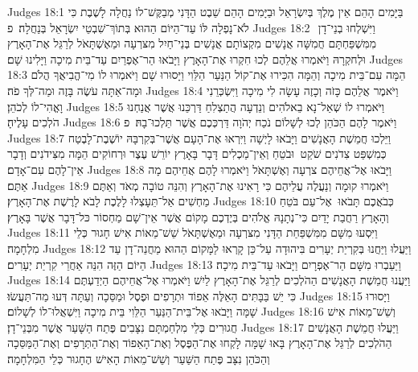 Judges 18:1	בַּיָּמִים הָהֵם אֵין מֶלֶךְ בְּיִשְׂרָאֵל וּבַיָּמִים הָהֵם שֵׁבֶט הַדָּנִי מְבַקֶּשׁ־לוֹ נַחֲלָה לָשֶׁבֶת כִּי לֹא־נָפְלָה לּוֹ עַד־הַיּוֹם הַהוּא בְּתוֹךְ־שִׁבְטֵי יִשְׂרָאֵל בְּנַחֲלָה׃ {פ}
Judges 18:2	וַיִּשְׁלְחוּ בְנֵי־דָן  מִמִּשְׁפַּחְתָּם חֲמִשָּׁה אֲנָשִׁים מִקְצוֹתָם אֲנָשִׁים בְּנֵי־חַיִל מִצּרְעָה וּמֵאֶשְׁתָּאֹל לְרַגֵּל אֶת־הָאָרֶץ וּלְחקְרָהּ וַיֹּאמְרוּ אֲלֵהֶם לְכוּ חִקְרוּ אֶת־הָאָרֶץ וַיָּבֹאוּ הַר־אֶפְרַיִם עַד־בֵּית מִיכָה וַיָּלִינוּ שָׁם׃
Judges 18:3	הֵמָּה עִם־בֵּית מִיכָה וְהֵמָּה הִכִּירוּ אֶת־קוֹל הַנַּעַר הַלֵּוִי וַיָּסוּרוּ שָׁם וַיֹּאמְרוּ לוֹ מִי־הֱבִיאֲךָ הֲלֹם וּמָה־אַתָּה עֹשֶׂה בָּזֶה וּמַה־לְּךָ פֹה׃
Judges 18:4	וַיֹּאמֶר אֲלֵהֶם כָּזֹה וְכָזֶה עָשָׂה לִי מִיכָה וַיִּשְׂכְּרֵנִי וָאֱהִי־לוֹ לְכֹהֵן׃
Judges 18:5	וַיֹּאמְרוּ לוֹ שְׁאַל־נָא בֵאלֹהִים וְנֵדְעָה הֲתַצְלִחַ דַּרְכֵּנוּ אֲשֶׁר אֲנַחְנוּ הֹלְכִים עָלֶיהָ׃
Judges 18:6	וַיֹּאמֶר לָהֶם הַכֹּהֵן לְכוּ לְשָׁלוֹם נֹכַח יְהֹוָה דַּרְכְּכֶם אֲשֶׁר תֵּלְכוּ־בָהּ׃ {פ}
Judges 18:7	וַיֵּלְכוּ חֲמֵשֶׁת הָאֲנָשִׁים וַיָּבֹאוּ לָיְשָׁה וַיִּרְאוּ אֶת־הָעָם אֲשֶׁר־בְּקִרְבָּהּ יוֹשֶׁבֶת־לָבֶטַח כְּמִשְׁפַּט צִדֹנִים שֹׁקֵט  וּבֹטֵחַ וְאֵין־מַכְלִים דָּבָר בָּאָרֶץ יוֹרֵשׁ עֶצֶר וּרְחוֹקִים הֵמָּה מִצִּידֹנִים וְדָבָר אֵין־לָהֶם עִם־אָדָם׃
Judges 18:8	וַיָּבֹאוּ אֶל־אֲחֵיהֶם צרְעָה וְאֶשְׁתָּאֹל וַיֹּאמְרוּ לָהֶם אֲחֵיהֶם מָה אַתֶּם׃
Judges 18:9	וַיֹּאמְרוּ קוּמָה וְנַעֲלֶה עֲלֵיהֶם כִּי רָאִינוּ אֶת־הָאָרֶץ וְהִנֵּה טוֹבָה מְאֹד וְאַתֶּם מַחְשִׁים אַל־תֵּעָצְלוּ לָלֶכֶת לָבֹא לָרֶשֶׁת אֶת־הָאָרֶץ׃
Judges 18:10	כְּבֹאֲכֶם תָּבֹאוּ  אֶל־עַם בֹּטֵחַ וְהָאָרֶץ רַחֲבַת יָדַיִם כִּי־נְתָנָהּ אֱלֹהִים בְּיֶדְכֶם מָקוֹם אֲשֶׁר אֵין־שָׁם מַחְסוֹר כּל־דָּבָר אֲשֶׁר בָּאָרֶץ׃
Judges 18:11	וַיִּסְעוּ מִשָּׁם מִמִּשְׁפַּחַת הַדָּנִי מִצּרְעָה וּמֵאֶשְׁתָּאֹל שֵׁשׁ־מֵאוֹת אִישׁ חָגוּר כְּלֵי מִלְחָמָה׃
Judges 18:12	וַיַּעֲלוּ וַיַּחֲנוּ בְּקִרְיַת יְעָרִים בִּיהוּדָה עַל־כֵּן קָרְאוּ לַמָּקוֹם הַהוּא מַחֲנֵה־דָן עַד הַיּוֹם הַזֶּה הִנֵּה אַחֲרֵי קִרְיַת יְעָרִים׃
Judges 18:13	וַיַּעַבְרוּ מִשָּׁם הַר־אֶפְרָיִם וַיָּבֹאוּ עַד־בֵּית מִיכָה׃
Judges 18:14	וַיַּעֲנוּ חֲמֵשֶׁת הָאֲנָשִׁים הַהֹלְכִים לְרַגֵּל אֶת־הָאָרֶץ לַיִשׁ וַיֹּאמְרוּ אֶל־אֲחֵיהֶם הַיְדַעְתֶּם כִּי יֵשׁ בַּבָּתִּים הָאֵלֶּה אֵפוֹד וּתְרָפִים וּפֶסֶל וּמַסֵּכָה וְעַתָּה דְּעוּ מַה־תַּעֲשׂוּ׃
Judges 18:15	וַיָּסוּרוּ שָׁמָּה וַיָּבֹאוּ אֶל־בֵּית־הַנַּעַר הַלֵּוִי בֵּית מִיכָה וַיִּשְׁאֲלוּ־לוֹ לְשָׁלוֹם׃
Judges 18:16	וְשֵׁשׁ־מֵאוֹת אִישׁ חֲגוּרִים כְּלֵי מִלְחַמְתָּם נִצָּבִים פֶּתַח הַשָּׁעַר אֲשֶׁר מִבְּנֵי־דָן׃
Judges 18:17	וַיַּעֲלוּ חֲמֵשֶׁת הָאֲנָשִׁים הַהֹלְכִים לְרַגֵּל אֶת־הָאָרֶץ בָּאוּ שָׁמָּה לָקְחוּ אֶת־הַפֶּסֶל וְאֶת־הָאֵפוֹד וְאֶת־הַתְּרָפִים וְאֶת־הַמַּסֵּכָה וְהַכֹּהֵן נִצָּב פֶּתַח הַשַּׁעַר וְשֵׁשׁ־מֵאוֹת הָאִישׁ הֶחָגוּר כְּלֵי הַמִּלְחָמָה׃
